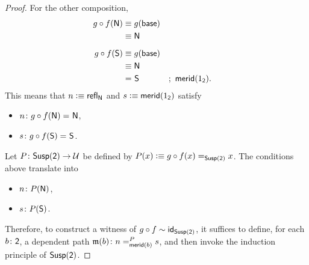 \begin{proof}
    For the other composition,
    \begin{align*}
        g\circ f(\mathsf{N})
            &\equiv g(\mathsf{base})\\
            &\equiv\mathsf{N}\\[2mm]
        g\circ f(\mathsf{S})
            &\equiv g(\mathsf{base})\\
            &\equiv\mathsf{N}\\
            &\mathrel{=_{}}\mathsf{S}
                &&;\ \mathsf{merid}(1_{\mathsf{2}}).
    \end{align*}
    This means that $n\mathrel{\vcentcolon}\equiv\mathsf{refl}_{\mathsf{N}}$ and $s\mathrel{\vcentcolon}\equiv\mathsf{merid}(1_{\mathsf{2}})$ satisfy
    \begin{itemize}
        \item $n\colon g\circ f(\fun N)\eq{}\fun N$,
        \item $s\colon g\circ f(\fun S)\eq{}\fun S$.
    \end{itemize}
    Let $P\colon\fun{Susp}(\fun2)\to\univ$ be defined by $P(x)\mathrel{\vcentcolon}\equiv g\circ f(x)\mathrel{=_{\mathsf{Susp}(\mathsf{2})}}x$. The conditions above translate into
    \begin{itemize}
        \item $n\colon P(\fun N)$,
        \item $s\colon P(\fun S)$.
    \end{itemize}
    Therefore, to construct a witness of $g\circ f\sim\mathsf{id}_{\mathsf{Susp}(\mathsf{2})}$, it suffices to define, for each $b\colon\fun2$, a dependent path $\mathfrak m(b)\colon n\eqt{\fun{merid}(b)}Ps$, and then invoke the induction principle of $\mathsf{Susp}(\mathsf{2})$.


\end{proof}
